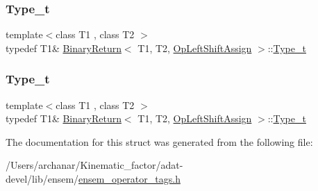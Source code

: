 \mbox{\label{structBinaryReturn_3_01T1_00_01T2_00_01OpLeftShiftAssign_01_4_a7d79a1ecfbc2faf0748a47701eee12af}} 
\subsubsection{\texorpdfstring{Type\_t}{Type\_t}\hspace{0.1cm}{\footnotesize\ttfamily [2/3]}}
{\footnotesize\ttfamily template$<$class T1 , class T2 $>$ \\
typedef T1\& \mbox{\hyperlink{structBinaryReturn}{Binary\+Return}}$<$ T1, T2, \mbox{\hyperlink{structOpLeftShiftAssign}{Op\+Left\+Shift\+Assign}} $>$\+::\mbox{\hyperlink{structBinaryReturn_3_01T1_00_01T2_00_01OpLeftShiftAssign_01_4_a7d79a1ecfbc2faf0748a47701eee12af}{Type\+\_\+t}}}

\mbox{\label{structBinaryReturn_3_01T1_00_01T2_00_01OpLeftShiftAssign_01_4_a7d79a1ecfbc2faf0748a47701eee12af}} 
\subsubsection{\texorpdfstring{Type\_t}{Type\_t}\hspace{0.1cm}{\footnotesize\ttfamily [3/3]}}
{\footnotesize\ttfamily template$<$class T1 , class T2 $>$ \\
typedef T1\& \mbox{\hyperlink{structBinaryReturn}{Binary\+Return}}$<$ T1, T2, \mbox{\hyperlink{structOpLeftShiftAssign}{Op\+Left\+Shift\+Assign}} $>$\+::\mbox{\hyperlink{structBinaryReturn_3_01T1_00_01T2_00_01OpLeftShiftAssign_01_4_a7d79a1ecfbc2faf0748a47701eee12af}{Type\+\_\+t}}}



The documentation for this struct was generated from the following file\+:\begin{DoxyCompactItemize}
\item 
/\+Users/archanar/\+Kinematic\+\_\+factor/adat-\/devel/lib/ensem/\mbox{\hyperlink{adat-devel_2lib_2ensem_2ensem__operator__tags_8h}{ensem\+\_\+operator\+\_\+tags.\+h}}\end{DoxyCompactItemize}
